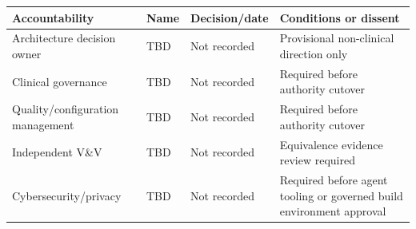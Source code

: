 \documentclass[11pt,letterpaper]{article}
\begin{document}
\begin{small}
\begin{longtable}{@{}L{0.24\textwidth}L{0.20\textwidth}L{0.18\textwidth}L{0.28\textwidth}@{}}
\toprule
{}\textbf{Accountability} & \textbf{Name} & \textbf{Decision/date} & \textbf{Conditions or dissent} \\
\midrule
Architecture decision owner & TBD & Not recorded & Provisional non-clinical direction only \\
\addlinespace[2pt]
Clinical governance & TBD & Not recorded & Required before authority cutover \\
\addlinespace[2pt]
Quality/configuration management & TBD & Not recorded & Required before authority cutover \\
\addlinespace[2pt]
Independent V\&V & TBD & Not recorded & Equivalence evidence review required \\
\addlinespace[2pt]
Cybersecurity/privacy & TBD & Not recorded & Required before agent tooling or governed build environment approval \\
\bottomrule
\end{longtable}
\end{small}
\end{document}
